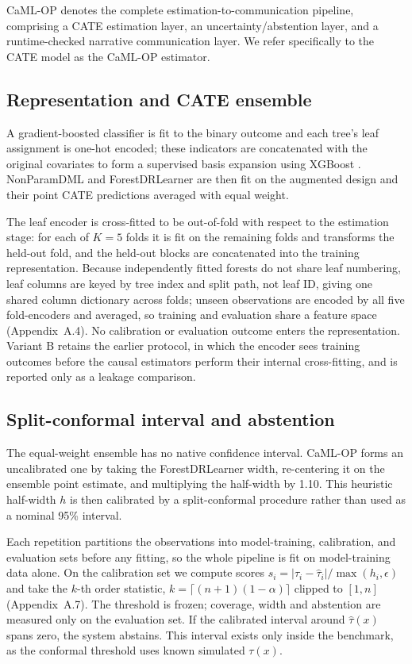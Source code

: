 \documentclass{article}
\begin{document}
CaML-OP denotes the complete estimation-to-communication pipeline, comprising a CATE estimation layer, an uncertainty/abstention layer, and a runtime-checked narrative communication layer. We refer specifically to the CATE model as the CaML-OP estimator.

\subsection{Representation and CATE ensemble}
A gradient-boosted classifier is fit to the binary outcome and each tree's leaf assignment is one-hot encoded; these indicators are concatenated with the original covariates to form a supervised basis expansion using XGBoost \citep{chen2016}. NonParamDML and ForestDRLearner are then fit on the augmented design and their point CATE predictions averaged with equal weight.

The leaf encoder is cross-fitted to be out-of-fold with respect to the estimation stage: for each of $K=5$ folds it is fit on the remaining folds and transforms the held-out fold, and the held-out blocks are concatenated into the training representation. Because independently fitted forests do not share leaf numbering, leaf columns are keyed by tree index and split path, not leaf ID, giving one shared column dictionary across folds; unseen observations are encoded by all five fold-encoders and averaged, so training and evaluation share a feature space (Appendix~A.4). No calibration or evaluation outcome enters the representation. Variant B retains the earlier protocol, in which the encoder sees training outcomes before the causal estimators perform their internal cross-fitting, and is reported only as a leakage comparison.

\subsection{Split-conformal interval and abstention}
The equal-weight ensemble has no native confidence interval. CaML-OP forms an uncalibrated one by taking the ForestDRLearner width, re-centering it on the ensemble point estimate, and multiplying the half-width by 1.10. This heuristic half-width $h$ is then calibrated by a split-conformal procedure rather than used as a nominal 95\% interval.

Each repetition partitions the observations into model-training, calibration, and evaluation sets before any fitting, so the whole pipeline is fit on model-training data alone. On the calibration set we compute scores $s_i=|\tau_i-\hat\tau_i|/\max(h_i,\epsilon)$ and take the $k$-th order statistic, $k=\lceil (n+1)(1-\alpha)\rceil$ clipped to $[1,n]$ (Appendix~A.7). The threshold is frozen; coverage, width and abstention are measured only on the evaluation set. If the calibrated interval around $\hat\tau(x)$ spans zero, the system abstains. This interval exists only inside the benchmark, as the conformal threshold uses known simulated $\tau(x)$.
\end{document}
